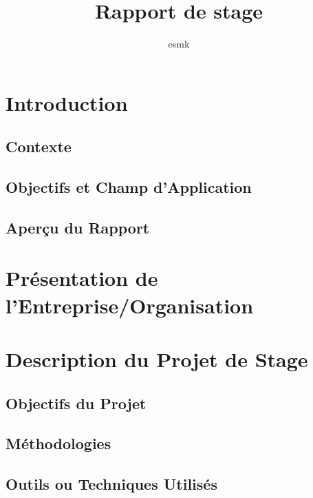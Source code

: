 \documentclass[12pt,a4paper]{report}
\title{Rapport de stage}
\author{esmk}
\begin{document}






\tableofcontents

\newpage


\chapter{Introduction}
\section{Contexte}

\section{Objectifs et Champ d'Application}

\section{Aperçu du Rapport}

\chapter{Présentation de l'Entreprise/Organisation}

\chapter{Description du Projet de Stage}
\section{Objectifs du Projet}

\section{Méthodologies}

\section{Outils ou Techniques Utilisés}
\end{document}
